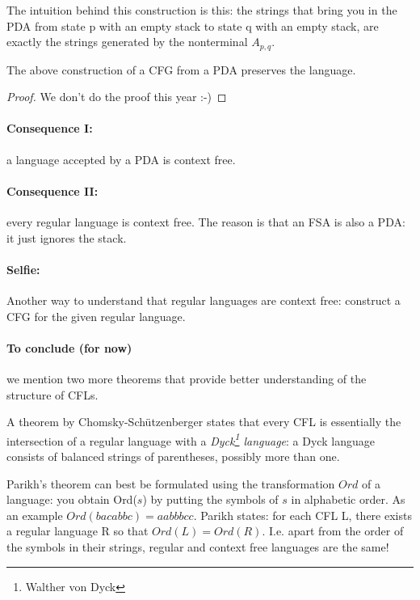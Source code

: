 The intuition behind this construction is this: the strings that bring
you in the PDA from state p with an empty stack to state q with an empty
stack, are exactly the strings generated by the nonterminal $A_{p,q}$.

\begin{lemma} \label{equicfgpda2}
The above construction of a CFG from a PDA preserves the language.
\end{lemma}
\begin{proof}
We don't do the proof this year :-)
\end{proof}


\paragraph{Consequence I:} a language accepted by a PDA is context free.

\paragraph{Consequence II:} every regular language is context free. The reason is that an FSA is also a PDA: it just ignores the stack.

\paragraph{Selfie:}
Another way to understand that regular languages are context free:
construct a CFG for the given regular language.

\paragraph{To conclude (for now)} we mention two more theorems
that provide better understanding of the structure of CFLs.

A theorem by Chomsky-Sch\"{u}tzenberger states that every CFL is
essentially the intersection of a regular language with a {\em
  Dyck\footnote{Walther von Dyck} language}: a Dyck language consists
of balanced strings of parentheses, possibly more than one.

Parikh's theorem can best be formulated using the transformation
$Ord$ of a language: you obtain Ord($s$) by putting the symbols of $s$
in alphabetic order. As an example $Ord(bacabbc) = aabbbcc$. Parikh
states: for each CFL L, there exists a regular language R so that
$Ord(L) = Ord(R)$. I.e. apart from the order of the symbols in their
strings, regular and context free languages are the same!

